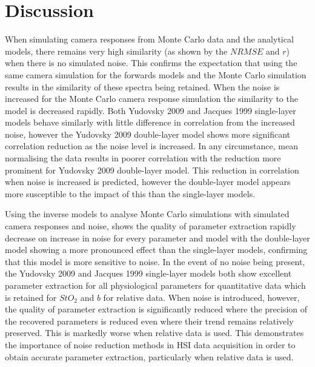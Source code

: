 \FloatBarrier
\section{Discussion} \label{sec:discussion5}
When simulating camera responses from Monte Carlo data and the analytical models, there remains very high similarity (as shown by the $NRMSE$ and $r$) when there is no simulated noise. This confirms the expectation that using the same camera simulation for the forwards models and the Monte Carlo simulation results in the similarity of these spectra being retained. When the noise is increased for the Monte Carlo camera response simulation the similarity to the model is decreased rapidly. Both Yudovsky 2009 and Jacques 1999 single-layer models behave similarly with little difference in correlation from the increased noise, however the Yudovsky 2009 double-layer model shows more significant correlation reduction as the noise level is increased. In any circumstance, mean normalising the data results in poorer correlation with the reduction more prominent for Yudovsky 2009 double-layer model. This reduction in correlation when noise is increased is predicted, however the double-layer model appears more susceptible to the impact of this than the single-layer models. 

Using the inverse models to analyse Monte Carlo simulations with simulated camera responses and noise, shows the quality of parameter extraction rapidly decrease on increase in noise for every parameter and model with the double-layer model showing a more pronounced effect than the single-layer models, confirming that this model is more sensitive to noise. In the event of no noise being present, the Yudovsky 2009 and Jacques 1999 single-layer models both show excellent parameter extraction for all physiological parameters for quantitative data which is retained for $StO_2$ and $b$ for relative data. When noise is introduced, however, the quality of parameter extraction is significantly reduced where the precision of the recovered parameters is reduced even where their trend remains relatively preserved. This is markedly worse when relative data is used. This demonstrates the importance of noise reduction methods in HSI data acquisition in order to obtain accurate parameter extraction, particularly when relative data is used. 

